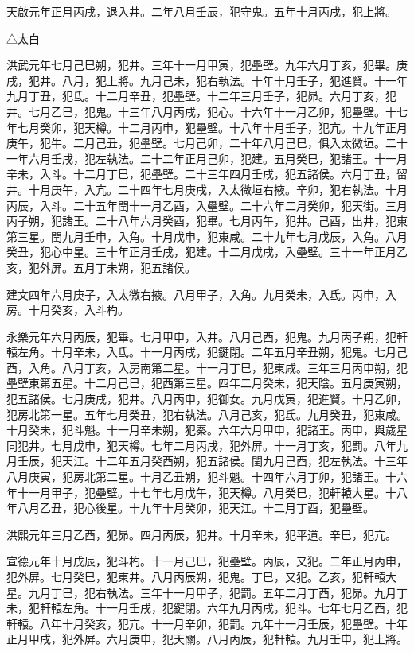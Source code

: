 \begin{pinyinscope}
天啟元年正月丙戌，退入井。二年八月壬辰，犯守鬼。五年十月丙戌，犯上將。

△太白

洪武元年七月己巳朔，犯井。三年十一月甲寅，犯壘壁。九年六月丁亥，犯畢。庚戌，犯井。八月，犯上將。九月己未，犯右執法。十年十月壬子，犯進賢。十一年九月丁丑，犯氐。十二月辛丑，犯壘壁。十二年三月壬子，犯昴。六月丁亥，犯井。七月乙巳，犯鬼。十三年八月丙戌，犯心。十六年十一月乙卯，犯壘壁。十七年七月癸卯，犯天樽。十二月丙申，犯壘壁。十八年十月壬子，犯亢。十九年正月庚午，犯牛。二月己丑，犯壘壁。七月己卯，二十年八月己巳，俱入太微垣。二十一年六月壬戌，犯左執法。二十二年正月己卯，犯建。五月癸巳，犯諸王。十一月辛未，入斗。十二月丁巳，犯壘壁。二十三年四月壬戌，犯五諸侯。六月丁丑，留井。十月庚午，入亢。二十四年七月庚戌，入太微垣右掖。辛卯，犯右執法。十月丙辰，入斗。二十五年閏十一月乙酉，入壘壁。二十六年二月癸卯，犯天街。三月丙子朔，犯諸王。二十八年六月癸酉，犯畢。七月丙午，犯井。己酉，出井，犯東第三星。閏九月壬申，入角。十月戊申，犯東咸。二十九年七月戊辰，入角。八月癸丑，犯心中星。三十年正月壬戌，犯建。十二月戊戌，入壘壁。三十一年正月乙亥，犯外屏。五月丁未朔，犯五諸侯。

建文四年六月庚子，入太微右掖。八月甲子，入角。九月癸未，入氐。丙申，入房。十月癸亥，入斗杓。

永樂元年六月丙辰，犯畢。七月甲申，入井。八月己酉，犯鬼。九月丙子朔，犯軒轅左角。十月辛未，入氐。十一月丙戌，犯鍵閉。二年五月辛丑朔，犯鬼。七月己酉，入角。八月丁亥，入房南第二星。十一月丁巳，犯東咸。三年三月丙申朔，犯壘壁東第五星。十二月己巳，犯西第三星。四年二月癸未，犯天陰。五月庚寅朔，犯五諸侯。七月庚戌，犯井。八月丙申，犯御女。九月戊寅，犯進賢。十月乙卯，犯房北第一星。五年七月癸丑，犯右執法。八月己亥，犯氐。九月癸丑，犯東咸。十月癸未，犯斗魁。十一月辛未朔，犯秦。六年六月甲申，犯諸王。丙申，與歲星同犯井。七月戊申，犯天樽。七年二月丙戌，犯外屏。十一月丁亥，犯罰。八年九月壬辰，犯天江。十二年五月癸酉朔，犯五諸侯。閏九月己酉，犯左執法。十三年八月庚寅，犯房北第二星。十月乙丑朔，犯斗魁。十四年六月丁卯，犯諸王。十六年十一月甲子，犯壘壁。十七年七月戊午，犯天樽。八月癸巳，犯軒轅大星。十八年八月乙丑，犯心後星。十九年十月癸卯，犯天江。十二月丁酉，犯壘壁。

洪熙元年三月乙酉，犯昴。四月丙辰，犯井。十月辛未，犯平道。辛巳，犯亢。

宣德元年十月戊辰，犯斗杓。十一月己巳，犯壘壁。丙辰，又犯。二年正月丙申，犯外屏。七月癸巳，犯東井。八月丙辰朔，犯鬼。丁巳，又犯。乙亥，犯軒轅大星。九月丁巳，犯右執法。三年十一月甲子，犯罰。五年二月丁酉，犯昴。九月丁未，犯軒轅左角。十一月壬戌，犯鍵閉。六年九月丙戌，犯斗。七年七月乙酉，犯軒轅。八年十月癸亥，犯亢。十一月辛卯，犯罰。九年十一月壬辰，犯壘壁。十年正月甲戌，犯外屏。六月庚申，犯天關。八月丙辰，犯軒轅。九月壬申，犯上將。


\end{pinyinscope}
